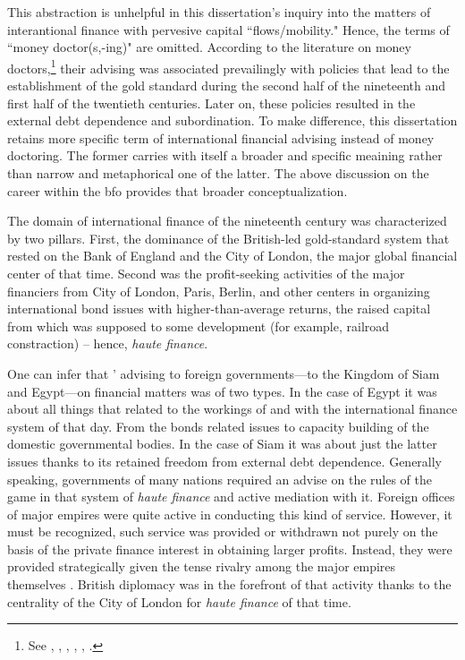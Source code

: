 This abstraction is unhelpful in this dissertation's inquiry into the matters of interantional finance with pervesive capital ``flows/mobility." Hence, the terms of ``money doctor(s,-ing)" are omitted. According to the literature on money doctors,\footnote{See \cite{drake1989}, \cite{rosenberg1999}, \cite{fland2003}, \cite{schiltz2012}, \cite{moneydoctors2021}, \cite{alvarez2024}.} their advising was associated prevailingly with policies that lead to the establishment of the gold standard during the second half of the nineteenth and first half of the twentieth centuries. Later on, these policies resulted in the external debt dependence and subordination. To make difference, this dissertation retains more specific term of international financial advising instead of money doctoring. The former carries with itself a broader and specific meaining rather than narrow and metaphorical one of the latter. The above discussion on the \citeauthor{innes1913} career within the \ac{bfo} provides that broader conceptualization. 

The domain of international finance of the nineteenth century was characterized by two pillars. First, the dominance of the British-led gold-standard system that rested on the Bank of England and the City of London, the major global financial center of that time. Second was the profit-seeking activities of the major financiers from City of London, Paris, Berlin, and other centers in organizing international bond issues with higher-than-average returns, the raised capital from which was supposed to some development (for example, railroad constraction) -- hence, \textit{haute finance}.

One can infer that \citeauthor{innes1913}' advising to foreign governments---to the Kingdom of Siam and Egypt---on financial matters was of two types. In the case of Egypt it was about all things that related to the workings of and with the international finance system of that day. From the bonds related issues to capacity building of the domestic governmental bodies. In the case of Siam it was about just the latter issues thanks to its retained freedom from external debt dependence. Generally speaking, governments of many nations required an advise on the rules of the game in that system of \textit{haute finance} and active mediation with it. Foreign offices of major empires were quite active in conducting this kind of service. However, it must be recognized, such service was provided or withdrawn not purely on the basis of the private finance interest in obtaining larger profits. Instead, they were provided strategically given the tense rivalry among the major empires themselves \citep[see][]{viner1929}. British diplomacy was in the forefront of that activity thanks to the centrality of the City of London for \textit{haute finance} of that time. 

